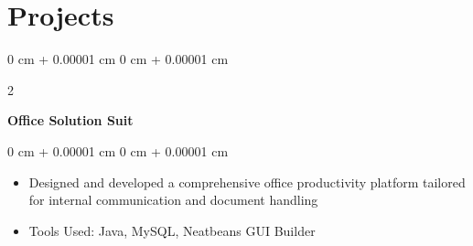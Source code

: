 \documentclass[10pt, letterpaper]{article}
\newenvironment{highlights}{
    \begin{itemize}[
        topsep=0.10 cm,
        parsep=0.10 cm,
        partopsep=0pt,
        itemsep=0pt,
        leftmargin=0 cm + 10pt
    ]
}{
    \end{itemize}
} %
\newenvironment{onecolentry}{
    \begin{adjustwidth}{
        0 cm + 0.00001 cm
    }{
        0 cm + 0.00001 cm
    }
}{
    \end{adjustwidth}
} %
\newenvironment{twocolentry}[2][]{
    \onecolentry
    \def\secondColumn{#2}
    \setcolumnwidth{\fill, 4.5 cm}
    \begin{paracol}{2}
}{
    \switchcolumn \raggedleft \secondColumn
    \end{paracol}
    \endonecolentry
} %
\begin{document}
    
    \section{Projects}
        
        \begin{twocolentry}{
        }
            \textbf{Office Solution Suit}\end{twocolentry}

        \vspace{0.10 cm}
        \begin{onecolentry}
            \begin{highlights}
                \item Designed and developed a comprehensive office productivity platform tailored for internal communication and document handling
                \item Tools Used: Java, MySQL, Neatbeans GUI Builder
            \end{highlights}
        \end{onecolentry}


        \vspace{0.2 cm}



    

        




    
\end{document}
